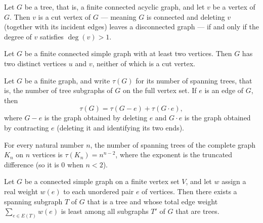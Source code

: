 \begin{theorem}
\label{SimpleGraph.tree_isCutVertex_iff_degree}
\leanok
{}
Let $G$ be a tree, that is, a finite connected acyclic graph, and let $v$ be a vertex of
$G$. Then $v$ is a cut vertex of $G$ — meaning $G$ is connected and deleting $v$
(together with its incident edges) leaves a disconnected graph — if and only if the
degree of $v$ satisfies $\deg(v) > 1$.
\end{theorem}

\begin{theorem}
\label{SimpleGraph.connected_two_non_cutVertices}
\leanok
{}
Let $G$ be a finite connected simple graph with at least two vertices. Then $G$ has two
distinct vertices $u$ and $v$, neither of which is a cut vertex.
\end{theorem}

\begin{theorem}
\label{SimpleGraph.numSpanningTrees_deletion_contraction}
Let $G$ be a finite graph, and write $\tau(G)$ for its number of spanning trees, that
is, the number of tree subgraphs of $G$ on the full vertex set. If $e$ is an edge of
$G$, then
\[
\tau(G) = \tau(G - e) + \tau(G \cdot e),
\]
where $G - e$ is the graph obtained by deleting $e$ and $G \cdot e$ is the graph
obtained by contracting $e$ (deleting it and identifying its two ends).
\end{theorem}

\begin{theorem}
\label{SimpleGraph.cayley}
\leanok
{}
For every natural number $n$, the number of spanning trees of the complete graph $K_n$
on $n$ vertices is $\tau(K_n) = n^{n-2}$, where the exponent is the truncated difference
(so it is $0$ when $n < 2$).
\end{theorem}

\begin{theorem}
\label{SimpleGraph.exists_min_weight_spanningTree}
\leanok
Let $G$ be a connected simple graph on a finite vertex set $V$, and let $w$ assign a
real weight $w(e)$ to each unordered pair $e$ of vertices. Then there exists a spanning
subgraph $T$ of $G$ that is a tree and whose total edge weight $\sum_{e \in E(T)} w(e)$
is least among all subgraphs $T'$ of $G$ that are trees.
\end{theorem}
